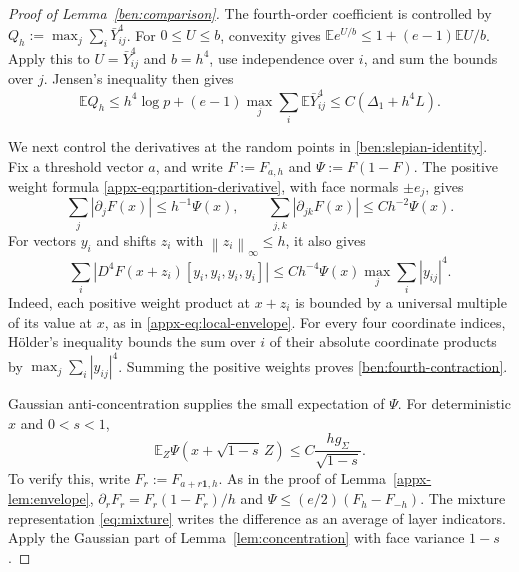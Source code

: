 \documentclass[11pt,letterpaper]{article}
\newenvironment{recovered}{}{}
\newenvironment{vSixBlock}{\color{magenta}}{}
\theoremstyle{remark}
\newcommand{\E}{\mathbb E}
\newcommand{\norm}[1]{\left\lVert#1\right\rVert}
\begin{document}
\begin{recovered}
\begin{proof}[Proof of Lemma~\ref{ben:comparison}]
The fourth-order coefficient is controlled by
\(Q_h:=\max_j\sum_i\bar Y_{ij}^4\). For \(0\le U\le b\),
convexity gives \(\E e^{U/b}\le1+(e-1)\E U/b\).
Apply this to \(U=\bar Y_{ij}^4\) and \(b=h^4\), use
independence over \(i\), and sum the bounds over \(j\).
Jensen's inequality then gives
\begin{equation}\label{ben:fourth-maximum}
 \E Q_h\le h^4\log p+(e-1)\max_j\sum_i\E\bar Y_{ij}^4
       \le C(\Delta_1+h^4L).
\end{equation}

We next control the derivatives at the random points in
\eqref{ben:slepian-identity}. Fix a threshold vector \(a\), and
write \(F:=F_{a,h}\) and \(\Psi:=F(1-F)\).
The positive weight formula \eqref{appx-eq:partition-derivative},
with face normals \(\pm e_j\), gives
\[
 \sum_j|\partial_jF(x)|\le h^{-1}\Psi(x),\qquad
 \sum_{j,k}|\partial_{jk}F(x)|\le Ch^{-2}\Psi(x).
\]
For vectors \(y_i\) and shifts \(z_i\) with
\(\norm{z_i}_\infty\le h\), it also gives
\begin{equation}\label{ben:fourth-contraction}
 \sum_i|D^4F(x+z_i)[y_i,y_i,y_i,y_i]|
 \le Ch^{-4}\Psi(x)\max_j\sum_i|y_{ij}|^4.
\end{equation}
Indeed, each positive weight product at \(x+z_i\) is bounded by
a universal multiple of its value at \(x\), as in
\eqref{appx-eq:local-envelope}. For every four coordinate indices,
H\"older's inequality bounds the sum over \(i\) of their absolute
coordinate products by \(\max_j\sum_i|y_{ij}|^4\). Summing the
positive weights proves \eqref{ben:fourth-contraction}.

\begin{vSixBlock}
Gaussian anti-concentration supplies the small expectation of
\(\Psi\). For deterministic \(x\) and \(0<s<1\),
\begin{equation}\label{ben:gaussian-envelope}
 \E_Z\Psi(x+\sqrt{1-s}\,Z)
 \le C\frac{hg_\Sigma}{\sqrt{1-s}}.
\end{equation}
To verify this, write \(F_r:=F_{a+r\mathbf1,h}\).
As in the proof of Lemma~\ref{appx-lem:envelope},
\(\partial_rF_r=F_r(1-F_r)/h\) and
\(\Psi\le(e/2)(F_h-F_{-h})\).
The mixture representation \eqref{eq:mixture} writes the difference
as an average of layer indicators. Apply the Gaussian part of
Lemma~\ref{lem:concentration} with face variance \(1-s\).


\end{vSixBlock}
\end{proof}
\end{recovered}
\end{document}
